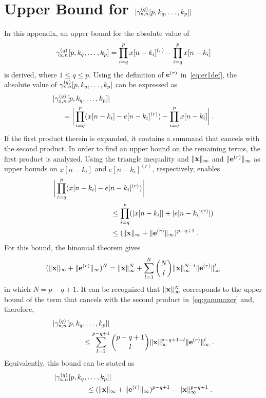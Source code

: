 \documentclass[10pt,twocolumn,twoside]{IEEEtran}
\begin{document}
\section{Upper Bound for $\lvert\gamma_{\mathrm{x},n}^{(q)}[p,k_q,\ldots,k_p]\rvert$}
	\label{gammaub}

In this appendix, an upper bound for the absolute value of
\begin{align}
	\gamma_{\mathrm{x},n}^{(q)}[p,k_q,\ldots,k_p] =
		\prod_{i=q}^p x[n-k_i]^{(r)} - \prod_{i=q}^p x[n-k_i]
	\label{eq:gammadef}
\end{align}
is derived, where $1\leq q\leq p$. Using the definition of $\bm{\mathrm{e}}^{(r)}$
in~\eqref{eq:er1def}, the absolute value of $\gamma_{\mathrm{x},n}^{(q)}[p,k_q,\ldots,k_p]$
can be expressed as
\begin{align}
\begin{split}
	&\lvert\gamma_{\mathrm{x},n}^{(q)}[p,k_q,\ldots,k_p]\rvert \\
		&\quad\ = \bigg| \prod_{i=q}^p (x[n-k_i] - e[n-k_i]^{(r)}) - \prod_{i=q}^p x[n-k_i] \bigg|\;.
\end{split}
	\label{eq:gammaxer}
\end{align}
If the first product therein is expanded, it contains a summand
that cancels with the second product. In order to find
an upper bound on the remaining terms, the first product is analyzed.
Using the triangle inequality and $\lVert\bm{\mathrm{x}}\rVert_\infty$ and $\lVert\bm{\mathrm{e}}^{(r)}\rVert_\infty$
as upper bounds on $x[n-k_i]$ and $e[n-k_i]^{(r)}$, respectively, enables
\begin{align*}
	&\bigg| \prod_{i=q}^p (x[n-k_i] - e[n-k_i]^{(r)}) \bigg| \\
		&\qquad\qquad\qquad\qquad \leq \prod_{i=q}^p (\lvert x[n-k_i]\rvert + \lvert e[n-k_i]^{(r)}\rvert) \\
		&\qquad\qquad\qquad\qquad \leq (\lVert\bm{\mathrm{x}}\rVert_\infty + \lVert\bm{\mathrm{e}}^{(r)}\rVert_\infty)^{p-q+1}\;.
\end{align*}
For this bound, the binomial theorem gives
\begin{align*}
	(\lVert\bm{\mathrm{x}}\rVert_\infty + \lVert\bm{\mathrm{e}}^{(r)}\rVert_\infty)^N
		= \lVert\bm{\mathrm{x}}\rVert_\infty^N
		+ \sum_{l=1}^{N} \binom{N}{l} \lVert\bm{\mathrm{x}}\rVert_\infty^{N-l}\lVert\bm{\mathrm{e}}^{(r)}\rVert_\infty^l
\end{align*}
in which $N=p-q+1$. It can be recognized that $\lVert\bm{\mathrm{x}}\rVert_\infty^N$ corresponds to the
upper bound of the term that cancels with the second product in~\eqref{eq:gammaxer}
and, therefore,
\begin{align}
\begin{split}
	\lvert\gamma_{\mathrm{x},n}^{(q)}[p,k_q&,\ldots,k_p]\rvert \\
		&\leq \sum_{l=1}^{p-q+1} \binom{p-q+1}{l} \lVert\bm{\mathrm{x}}\rVert_\infty^{p-q+1-l}\lVert\bm{\mathrm{e}}^{(r)}\rVert_\infty^l\;.
\end{split}
	\label{eq:gammaabsub1}
\end{align}
Equivalently, this bound can be stated as
\begin{align}
\begin{split}
	\lvert\gamma_{\mathrm{x},n}^{(q)}[p,k_q,&\ldots,k_p]\rvert \\
		&\leq (\lVert\bm{\mathrm{x}}\rVert_\infty + \lVert\bm{\mathrm{e}}^{(r)}\rVert_\infty)^{p-q+1} - \lVert\bm{\mathrm{x}}\rVert_\infty^{p-q+1}\;.
\end{split}
	\label{eq:gammaabsub2}
\end{align}
\end{document}
